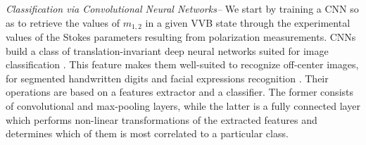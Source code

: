 

\textit{Classification via Convolutional Neural Networks--} We start by training a \ac{CNN} so as to retrieve the values of $m_{1,2}$ in a given VVB state through the experimental values of the Stokes parameters resulting from polarization measurements.  \acp{CNN} build a class of translation-invariant deep neural networks suited for image classification
. This feature makes them well-suited to recognize off-center images, 
 for segmented handwritten digits \cite{simard2003best,ciresan2011flexible} 
 and facial expressions recognition \cite{matsugu2003subject}. 
 Their operations are based on a features extractor and a classifier. The former consists of convolutional and max-pooling layers, while the latter is a fully connected layer which performs non-linear transformations of the extracted features and determines which of them is most correlated to a particular class.
 
